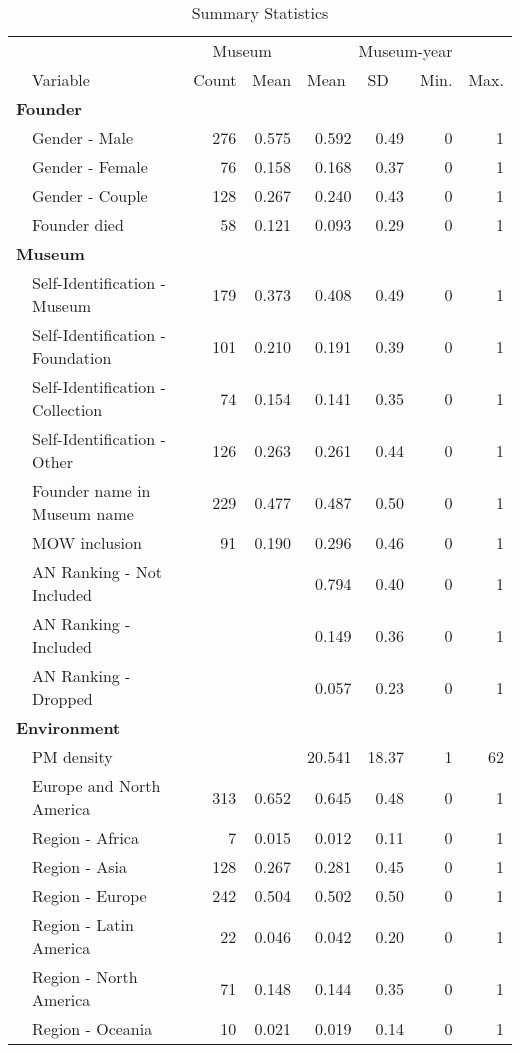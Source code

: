 \documentclass[11pt]{article}
\begin{document}
\begin{table}[ht]
\centering
\begin{tabular}{llrrrrrr}
  \hline
 & & \multicolumn{2}{c}{Museum} & \multicolumn{4}{c}{Museum-year} \\ 
\cmidrule(r){3-4}\cmidrule(r){5-8} \multicolumn{1}{l}{} & \multicolumn{1}{l}{Variable} & \multicolumn{1}{l}{Count} & \multicolumn{1}{l}{Mean} & \multicolumn{1}{l}{Mean} & \multicolumn{1}{l}{SD} & \multicolumn{1}{l}{Min.} & \multicolumn{1}{l}{Max.}\\ 
 \hline
  \multicolumn{8}{l}{\textbf{Founder}} \\ 
 & Gender - Male & 276 & 0.575 &  0.592 &  0.49 & 0 &  1 \\ 
   & Gender - Female & 76 & 0.158 &  0.168 &  0.37 & 0 &  1 \\ 
   & Gender - Couple & 128 & 0.267 &  0.240 &  0.43 & 0 &  1 \\ 
   & Founder died & 58 & 0.121 &  0.093 &  0.29 & 0 &  1 \\ 
   \multicolumn{8}{l}{\textbf{Museum}} \\ 
 & Self-Identification - Museum & 179 & 0.373 &  0.408 &  0.49 & 0 &  1 \\ 
   & Self-Identification - Foundation & 101 & 0.210 &  0.191 &  0.39 & 0 &  1 \\ 
   & Self-Identification - Collection & 74 & 0.154 &  0.141 &  0.35 & 0 &  1 \\ 
   & Self-Identification - Other & 126 & 0.263 &  0.261 &  0.44 & 0 &  1 \\ 
   & Founder name in Museum name & 229 & 0.477 &  0.487 &  0.50 & 0 &  1 \\ 
   & MOW inclusion & 91 & 0.190 &  0.296 &  0.46 & 0 &  1 \\ 
   & AN Ranking - Not Included &  &  &  0.794 &  0.40 & 0 &  1 \\ 
   & AN Ranking - Included &  &  &  0.149 &  0.36 & 0 &  1 \\ 
   & AN Ranking - Dropped &  &  &  0.057 &  0.23 & 0 &  1 \\ 
   \multicolumn{8}{l}{\textbf{Environment}} \\ 
 & PM density &  &  & 20.541 & 18.37 & 1 & 62 \\ 
   & Europe and North America & 313 & 0.652 &  0.645 &  0.48 & 0 &  1 \\ 
   & Region - Africa & 7 & 0.015 &  0.012 &  0.11 & 0 &  1 \\ 
   & Region - Asia & 128 & 0.267 &  0.281 &  0.45 & 0 &  1 \\ 
   & Region - Europe & 242 & 0.504 &  0.502 &  0.50 & 0 &  1 \\ 
   & Region - Latin America & 22 & 0.046 &  0.042 &  0.20 & 0 &  1 \\ 
   & Region - North America & 71 & 0.148 &  0.144 &  0.35 & 0 &  1 \\ 
   & Region - Oceania & 10 & 0.021 &  0.019 &  0.14 & 0 &  1 \\ 
   \hline
\end{tabular}
\caption{Summary Statistics} 
\label{tbl:t_sumstats}
\end{table}
\end{document}
